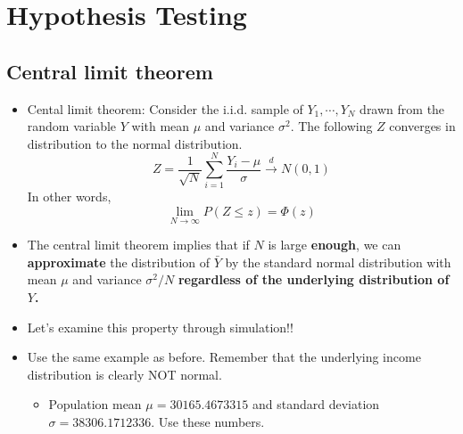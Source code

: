 \documentclass[]{book}
\providecommand{\tightlist}{%
  \setlength{\itemsep}{0pt}\setlength{\parskip}{0pt}}
\begin{document}
\section{Hypothesis Testing}\label{hypothesis-testing}

\subsection{Central limit theorem}\label{central-limit-theorem}

\begin{itemize}
\item
  Cental limit theorem: Consider the i.i.d. sample of
  \(Y_1,\cdots, Y_N\) drawn from the random variable \(Y\) with mean
  \(\mu\) and variance \(\sigma^2\). The following \(Z\) converges in
  distribution to the normal distribution. \[
  Z = \frac{1}{\sqrt{N}} \sum_{i=1}^N \frac{Y_i - \mu}{\sigma } \overset{d}{\rightarrow}N(0,1)
  \] In other words, \[
  \lim_{N\rightarrow\infty}P\left(Z \leq z\right)=\Phi(z)
  \]
\item
  The central limit theorem implies that if \(N\) is large
  \textbf{enough}, we can \textbf{approximate} the distribution of
  \(\bar{Y}\) by the standard normal distribution with mean \(\mu\) and
  variance \(\sigma^2 / N\) \textbf{regardless of the underlying
  distribution of \(Y\).}
\item
  Let's examine this property through simulation!!
\item
  Use the same example as before. Remember that the underlying income
  distribution is clearly NOT normal.

  \begin{itemize}
  \tightlist
  \item
    Population mean \(\mu = 30165.4673315\) and standard deviation
    \(\sigma = 38306.1712336\). Use these numbers.
  \end{itemize}
\end{itemize}
\end{document}

